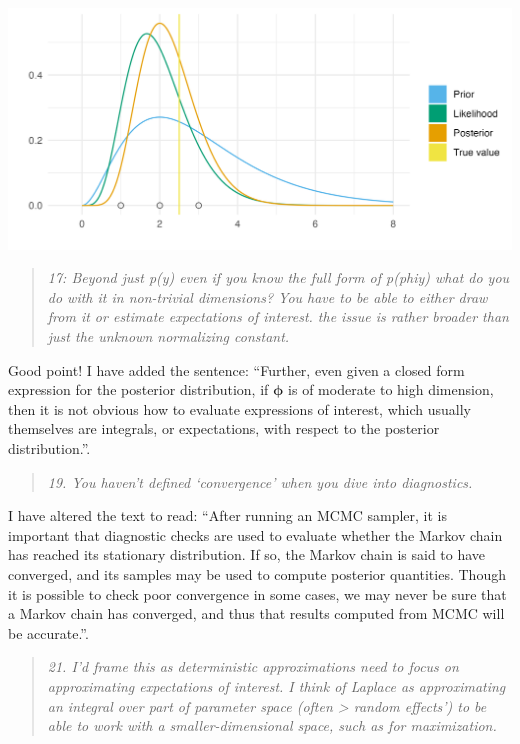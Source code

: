 \documentclass[
  12pt,
]{article}
\begin{document}
\begin{center}\includegraphics[width=0.95\linewidth]{../figures/bayesian/conjugate} \end{center}

\begin{quote}
\emph{17: Beyond just p(y) even if you know the full form of
p(phi\textbar y) what do you do with it in non-trivial dimensions? You
have to be able to either draw from it or estimate expectations of
interest. the issue is rather broader than just the unknown normalizing
constant.}
\end{quote}

Good point! I have added the sentence: ``Further, even given a closed
form expression for the posterior distribution, if
\(\boldsymbol{\mathbf{\phi}}\) is of moderate to high dimension, then it
is not obvious how to evaluate expressions of interest, which usually
themselves are integrals, or expectations, with respect to the posterior
distribution.''.

\begin{quote}
\emph{19. You haven't defined `convergence' when you dive into
diagnostics.}
\end{quote}

I have altered the text to read: ``After running an MCMC sampler, it is
important that diagnostic checks are used to evaluate whether the Markov
chain has reached its stationary distribution. If so, the Markov chain
is said to have converged, and its samples may be used to compute
posterior quantities. Though it is possible to check poor convergence in
some cases, we may never be sure that a Markov chain has converged, and
thus that results computed from MCMC will be accurate.''.

\begin{quote}
\emph{21. I'd frame this as deterministic approximations need to focus
on approximating expectations of interest. I think of Laplace as
approximating an integral over part of parameter space (often
\textgreater{} random effects') to be able to work with a
smaller-dimensional space, such as for maximization.}
\end{quote}
\end{document}
